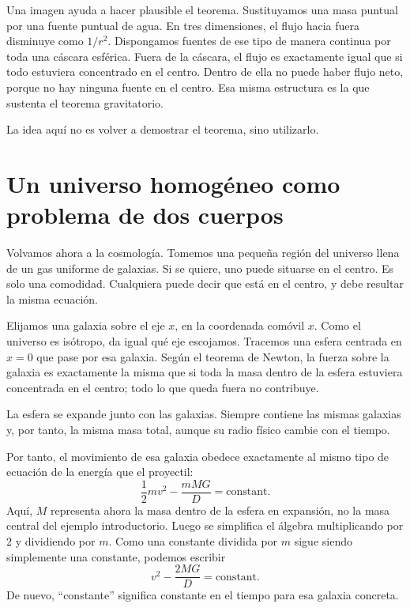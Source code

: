 Una imagen ayuda a hacer plausible el teorema. Sustituyamos una masa puntual por una fuente puntual de agua. En tres dimensiones, el flujo hacia fuera disminuye como \(1/r^2\). Dispongamos fuentes de ese tipo de manera continua por toda una cáscara esférica. Fuera de la cáscara, el flujo es exactamente igual que si todo estuviera concentrado en el centro. Dentro de ella no puede haber flujo neto, porque no hay ninguna fuente en el centro. Esa misma estructura es la que sustenta el teorema gravitatorio.

La idea aquí no es volver a demostrar el teorema, sino utilizarlo.

\section{Un universo homogéneo como problema de dos cuerpos}

Volvamos ahora a la cosmología. Tomemos una pequeña región del universo llena de un gas uniforme de galaxias. Si se quiere, uno puede situarse en el centro. Es solo una comodidad. Cualquiera puede decir que está en el centro, y debe resultar la misma ecuación.

Elijamos una galaxia sobre el eje \(x\), en la coordenada comóvil \(x\). Como el universo es isótropo, da igual qué eje escojamos. Tracemos una esfera centrada en \(x=0\) que pase por esa galaxia. Según el teorema de Newton, la fuerza sobre la galaxia es exactamente la misma que si toda la masa dentro de la esfera estuviera concentrada en el centro; todo lo que queda fuera no contribuye.

La esfera se expande junto con las galaxias. Siempre contiene las mismas galaxias y, por tanto, la misma masa total, aunque su radio físico cambie con el tiempo.

Por tanto, el movimiento de esa galaxia obedece exactamente al mismo tipo de ecuación de la energía que el proyectil:
\begin{equation}
\frac{1}{2}mv^2-\frac{mMG}{D}=\text{constant}.
\end{equation}
Aquí, \(M\) representa ahora la masa dentro de la esfera en expansión, no la masa central del ejemplo introductorio. Luego se simplifica el álgebra multiplicando por \(2\) y dividiendo por \(m\). Como una constante dividida por \(m\) sigue siendo simplemente una constante, podemos escribir
\begin{equation}
v^2-\frac{2MG}{D}=\text{constant}.
\end{equation}
De nuevo, ``constante'' significa constante en el tiempo para esa galaxia concreta.

